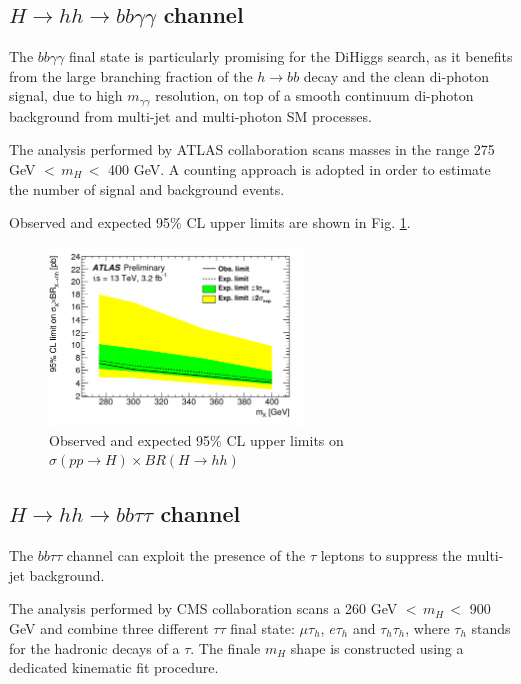 \subsection{$H\rightarrow hh \rightarrow bb\gamma\gamma$ channel}

The $bb\gamma\gamma$ final state is particularly promising for the DiHiggs search, as it benefits from the large branching fraction of the $h\rightarrow bb$ decay and the clean di-photon signal, due to high $m_{\gamma\gamma}$ resolution, on top of a smooth continuum di-photon background from multi-jet and multi-photon SM processes. 

The analysis performed by ATLAS collaboration scans masses in the range 275 GeV $ < \, m_{H}  \,< $ 400 GeV. A counting approach is adopted in order to estimate the number of signal and background events.

Observed and expected 95\% CL upper limits are shown in Fig. \ref{fig:HH_bbgg}.
\begin{figure}[htb]
\centering
	\includegraphics[width=0.6\textwidth, angle=0] {figures/H_hh_bbgg_ATLAS_BR.png}
\caption{Observed and expected 95\% CL upper limits on $\sigma(pp\rightarrow H) \times BR(H \rightarrow hh )$}
\label{fig:HH_bbgg}   
\end{figure}
 
\subsection{$H\rightarrow hh \rightarrow bb\tau\tau$ channel}
The $bb\tau\tau$ channel can exploit the presence of the $\tau$ leptons to suppress the multi-jet background.

The analysis performed by CMS collaboration scans a 260 GeV $ < \, m_{H}  \,< $ 900 GeV and combine three different $\tau\tau$ final state: $\mu\tau_h$, $e\tau_h$ and $\tau_h\tau_h$, where $\tau_h$ stands for the hadronic decays of a $\tau$. 
The finale $m_H$ shape is constructed using a dedicated kinematic fit procedure.


